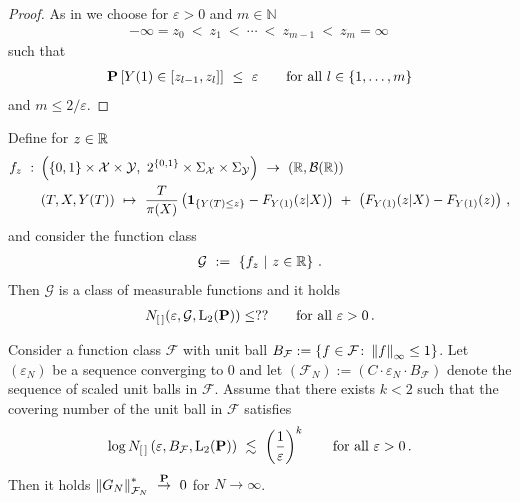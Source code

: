 \begin{proof}
  As in \cite[Example~19.6]{Vaart2000}
  we choose for
  $\varepsilon>0$ and $m\in\mathbb{N}$
  \begin{gather}
  -\infty=z_0\ <\ z_1\ <\ \cdots\ <\ z_{m-1}\ <\ z_m=\infty
  \,
  \end{gather}
  such that
  \begin{gather}
    \P
    \left[ 
      Y(1)\in \left[ z_{l-1},z_l \right]
    \right]
    \ 
    \le
    \ 
    \varepsilon
    \qquad
    \text{for all}\ 
    l\in \left\{ 1,\ldots,m \right\}
  \end{gather}
  and $m \le 2/\varepsilon$.

\end{proof}
\begin{lemma}
  Define for
  $z\in\mathbb{R}$
 \begin{align*}
    f_z
    \ 
    :
    \ 
    &
    \left( 
      \left\{ 0,1 \right\}
      \times
      \mathcal{X}
      \times
      \mathcal{Y}
      ,
      \ 
      2^{\left\{ 0,1 \right\}}
      \times
      \Sigma_\mathcal{X}
      \times
      \Sigma_\mathcal{Y}
    \right)
    \ 
    \to
    \ 
    \left( 
      \R,
      \mathcal{B}(\R)
    \right)
    \\
    &
    \left(
      T,X,Y(T)
    \right)
      \ 
      \mapsto
      \ 
      \frac{T}{\pi(X)}
      \left( 
        \mathbf{1}
        _{\left\{ Y(T)\le z \right\}}
        -
        F_{Y(1)}(z|X)
      \right)
      \ 
      +
      \ 
      \left( 
        F_{Y(1)}(z|X)
        -
        F_{Y(1)}(z)
      \right)
      \,,
  \end{align*}
and consider the function class
\begin{gather}
  \mathcal{G}
  \ 
  :=
  \ 
  \left\{ 
    f_z
  \ 
    |
  \ 
    z\in\R
  \right\}
    \,.
\end{gather}
  Then $\mathcal{G}$ is a class of measurable functions 
  and it holds
  \begin{gather}
    N_{[\,]}(\varepsilon,\mathcal{G},\mathrm{L}_2(\P))
    \le
    ??
    \qquad
    \text{for all}
    \ 
    \varepsilon>0
    \,.
  \end{gather}
\end{lemma}
\begin{lemma}
  \label{lemma_max_ineq}
  Consider a function class $\mathcal{F}$ with unit ball
  $
  B_{\mathcal{F}}
  :=
  \left\{ 
    f\in \mathcal{F}
    \colon
    \left\lVert f\right\rVert_\infty
    \le
    1
  \right\}
  $.
  Let $(\varepsilon_N)$ be a sequence converging to 0
  and let 
  $
  \left( 
    \mathcal{F}_N
  \right)
    :=
    \left( 
      C\cdot
    \varepsilon_N\cdot B_\mathcal{F}
    \right)
  $
  denote the sequence of scaled unit balls in $\mathcal{F}$.
  Assume that 
  there exists
  $k<2$ such that 
  the covering number of the unit ball in $\mathcal{F}$
  satisfies
  \begin{gather}
        \log 
      N_{[\,]}
\left( \varepsilon, B_\mathcal{F},\mathrm{L}_2(\P) \right)
\ 
\lesssim
\ 
\left( \frac{1}{\varepsilon} \right)^k
\qquad
\text{for all}\ 
\varepsilon>0
\,.
  \end{gather}
  Then it holds
  $
      \norm{G_N}^*_{\mathcal{F}_N}
    \ 
    \overset{\P}
    {\to}
    \ 
    0
  $
  for $N\to \infty$. 
\end{lemma}
